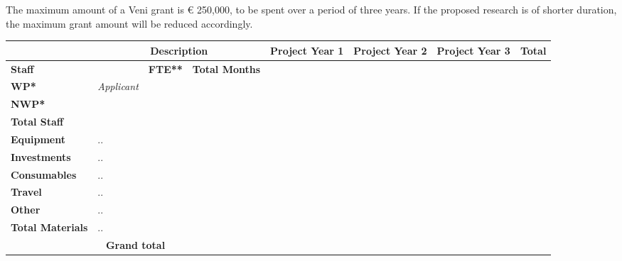 \documentclass[10pt]{article}
\newcommand{\tableheadfont}{\bfseries\fontsize{10}{10}\selectfont\leavevmode\color{tableblue}}
\begin{document}
	The maximum amount of a Veni grant is € 250,000, to be spent over a period of three years. If the proposed research is of shorter duration, the maximum grant amount will be reduced accordingly.
	
	\vspace{0.4cm}
	\noindent
	{\renewcommand{\arraystretch}{1.5}
	\begin{tabularx}{\linewidth}{|p{2.5cm}|p{1.5cm}|p{1.5cm}|p{1.5cm}|X|X|X|X|}
		\arrayrulecolor[gray]{0.4}\hline
		{\rowcolor[gray]{0.95}} & \multicolumn{3}{c|}{\tableheadfont Description}  & {\tableheadfont Project Year 1} & {\tableheadfont Project Year 2}  & {\tableheadfont Project Year 3} & {\tableheadfont Total} \\\hline
		{\cellcolor[gray]{0.95}\tableheadfont Staff} & {\cellcolor[gray]{0.95} } & {\cellcolor[gray]{0.95}\tableheadfont FTE**} & {\cellcolor[gray]{0.95}\tableheadfont Total Months} & & & & \\\hline
		{\cellcolor[gray]{0.95}\tableheadfont WP*} & \textit{Applicant} & &  & & & & \\\hline
		{\cellcolor[gray]{0.95}\tableheadfont NWP*} & & &  & & & & \\\hline
		{\cellcolor[gray]{0.95}\tableheadfont Total Staff} & & &  & & & & \\\hline
		{\cellcolor[gray]{0.95}\tableheadfont Equipment} & \multicolumn{3}{l|}{..} & & & & \\\hline
		{\cellcolor[gray]{0.95}\tableheadfont Investments} & \multicolumn{3}{l|}{..} & & & & \\\hline
		{\cellcolor[gray]{0.95}\tableheadfont Consumables} & \multicolumn{3}{l|}{..} & & & & \\\hline
		{\cellcolor[gray]{0.95}\tableheadfont Travel} & \multicolumn{3}{l|}{..} & & & & \\\hline
		{\cellcolor[gray]{0.95}\tableheadfont Other} & \multicolumn{3}{l|}{..} & & & & \\\hline
		{\cellcolor[gray]{0.95}\tableheadfont Total Materials} & \multicolumn{3}{l|}{..} & & & & \\\hline
		\multicolumn{4}{|c|}{\cellcolor[gray]{0.95}\tableheadfont Grand total} & & & & \\\hline
	\end{tabularx}
	}
	
\end{document}
